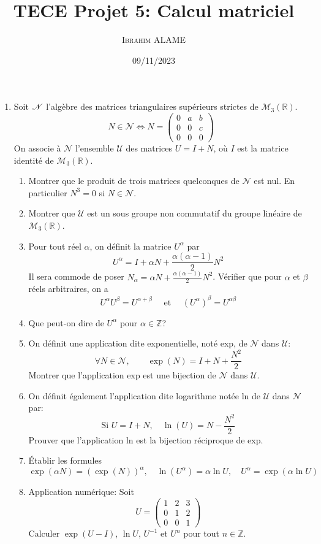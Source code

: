 \documentclass{article}[11pt]
\title{TECE Projet 5: Calcul matriciel}
\author{ \textsc{Ibrahim ALAME}}
\date{09/11/2023}
\begin{document}
\maketitle
\begin{enumerate}
\item Soit ${\cal N}$ l'algèbre des matrices triangulaires supérieurs strictes de $\mathcal{M}_3(\mathbb{R})$.
\[N\in \mathcal{N} \Longleftrightarrow N=\left(\begin{array}{ccc} 0&a&b\\ 0&0&c\\0&0&0
\end{array}\right)\]
On associe à $\mathcal{N}$ l'ensemble  $\mathcal{U}$  des matrices $U=I+N$, où $I$ est la matrice identité de $\mathcal{M}_3(\mathbb{R})$.
\begin{enumerate}
\item  Montrer que le produit de trois matrices quelconques de $\mathcal{N}$ est nul. En particulier $N^3=0$ si $N\in\mathcal{N}$.
\item Montrer que $\mathcal{U}$ est un sous groupe non commutatif du groupe linéaire de $\mathcal{M}_3(\mathbb{R})$.
\item Pour tout réel $\alpha$, on définit la matrice $U^\alpha$ par
\[U^\alpha=I+\alpha N+\frac{\alpha(\alpha-1)}{2}N^2\]
Il sera commode de poser $N_\alpha = \alpha N +\frac{\alpha(\alpha-1)}{2}N^2$. Vérifier que pour $\alpha$ et $\beta$ réels arbitraires, on a
\[U^\alpha U^\beta =U^{\alpha+\beta}\quad\mbox{ et }\quad (U^\alpha)^\beta=U^{\alpha\beta}\]
\item Que peut-on dire de $U^\alpha$ pour $\alpha\in\mathbb{Z}$?
\item On définit une application dite exponentielle, noté exp, de $\mathcal{N}$ dans $\mathcal{U}$:
\[\forall N\in\mathcal{N},\qquad \exp(N)=I+N+\frac{N^2}{2}\]
Montrer que l'application exp est une bijection de $\mathcal{N}$ dans $\mathcal{U}$.
\item On définit également l'application dite logarithme notée ln de $\mathcal{U}$ dans $\mathcal{N}$ par:
\[\mbox{Si } U=I+N,\quad \ln(U)=N-\frac{N^2}{2}\]
Prouver que l'application ln est la bijection réciproque de exp.
\item Établir les formules
\[\exp(\alpha N)=(\exp(N))^\alpha,\quad \ln(U^\alpha)=\alpha\ln U,\quad U^\alpha=\exp(\alpha\ln U)\]
\item Application numérique: Soit
\[U=\left(\begin{array}{ccc} 1&2&3\\ 0&1&2\\0&0&1
\end{array}\right)\]
Calculer $\exp(U-I)$, $\ln U$, $U^{-1}$ et $U^n$ pour tout $n\in\mathbb{Z}$.
\end{enumerate}


\end{enumerate}
\end{document}
